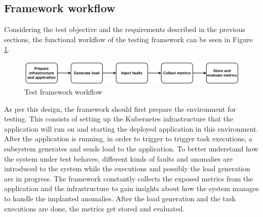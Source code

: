 
\subsection{Framework workflow}



Considering the test objective and the requirements described in the previous sections, the functional workflow of the testing framework can be seen in Figure \ref{fig:test_framework_workflow}.

\begin{figure}[h]
	\centering
	\includegraphics[width=140mm, keepaspectratio]{figures/test_framework_workflow.png}
	\caption{Test framework workflow}
	\label{fig:test_framework_workflow}
\end{figure}

As per this design, the framework should first prepare the environment for testing. This consists of setting up the Kubernetes infrastructure that the application will run on and starting the deployed application in this environment. After the application is running, in order to trigger to trigger task executions, a subsystem generates and sends load to the application. To better understand how the system under test behaves, different kinds of faults and anomalies are introduced to the system while the executions and possibly the load generation are in progress. The framework constantly collects the exposed metrics from the application and the infrastructure to gain insights about how the system manages to handle the implanted anomalies. After the load generation and the task executions are done, the metrics get stored and evaluated.

